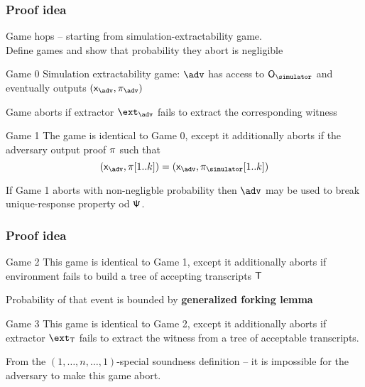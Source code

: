 \documentclass[aspectratio=169,handout]{beamer}
\renewcommand{\emph}[1]{\textbf{#1}}
\begin{document}
\begin{frame}
  \frametitle{Proof idea}
  Game hops -- starting from simulation-extractability game.\\
  Define games and show that probability they abort is negligible

\begin{block}{Game 0}
  Simulation extractability game: $\adv$ has access to $\oracles$ and eventually
  outputs $(\inpa, \zkproofa)$

  Game aborts if extractor $\ext_\adv$ fails to extract the corresponding witness
\end{block}

\begin{block}{Game 1}
  The game is identical to Game 0, except it additionally aborts if the
  adversary output proof $\pi$ such that
  \[
    (\inpa, \zkproof[1..k]) = (\inpa, \zkproofs[1..k])
  \]

  If Game 1 aborts with non-negligble probability then $\adv$ may be used to
  break unique-response property od ${\mathsf{\Psi}}$.
\end{block}
\end{frame}

\begin{frame}
  \frametitle{Proof idea}
\begin{block}{Game 2}
  This game is identical to Game 1, except it additionally aborts if environment
  fails to build a tree of accepting transcripts $\mathsf{T}$

  Probability of that event is bounded by \emph{generalized forking lemma}
\end{block}

\begin{block}{Game 3}
  This game is identical to Game 2, except it additionally aborts if extractor
  $\ext_\tree$ fails to extract the witness from a tree of acceptable
  transcripts.

  From the $(1, \ldots, n, \ldots, 1)$-special soundness definition -- it is
  impossible for the adversary to make this game abort.
\end{block}

\end{frame}
\end{document}
